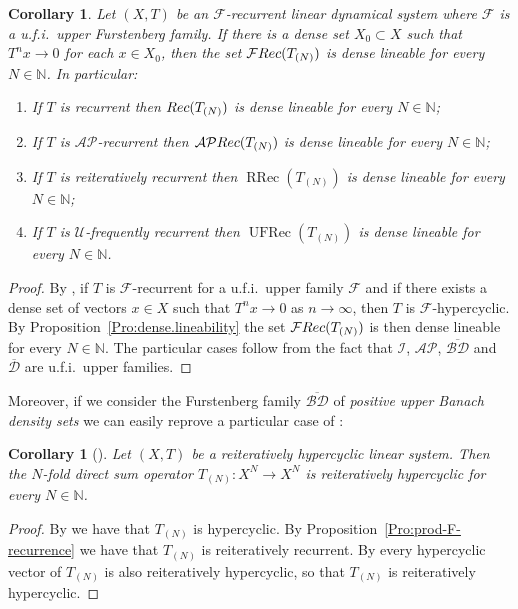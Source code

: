 \documentclass[openright,11pt]{article}
\theoremstyle{plain}
\newtheorem{corollary}[theorem]{Corollary}
\theoremstyle{definition}
\newcommand{\NN}{\mathbb{N}}
\newcommand{\AP}{\mathcal{AP}}
\newcommand{\Fc}{\mathcal{F}}
\newcommand{\Ic}{\mathcal{I}}
\newcommand{\Uc}{\mathcal{U}}
\newcommand{\UFRec}{\operatorname{UFRec}}
\newcommand{\RRec}{\operatorname{RRec}}
\newcommand{\Rec}{\textup{Rec}}
\newcommand{\BDsup}{\overline{\mathcal{BD}}}
\newcommand{\Dsup}{\overline{\mathcal{D}}}
\begin{document}
\begin{corollary}
	Let $(X,T)$ be an $\Fc$-recurrent linear dynamical system where $\Fc$ is a u.f.i.\ upper Furstenberg family. If there is a dense set $X_0 \subset X$ such that $T^nx\to 0$ for each $x \in X_0$, then the set $\Fc\Rec(T_{(N)})$ is dense lineable for every $N \in \NN$. In particular:
	\begin{enumerate}[{\em(a)}]
		\item If $T$ is recurrent then $\Rec(T_{(N)})$ is dense lineable for every $N \in \NN$;
		
		\item If $T$ is $\AP$-recurrent then $\AP\Rec(T_{(N)})$ is dense lineable for every $N \in \NN$;
		
		\item If $T$ is reiteratively recurrent then $\RRec(T_{(N)})$ is dense lineable for every $N \in \NN$;
		
		\item If $T$ is $\Uc$-frequently recurrent then $\UFRec(T_{(N)})$ is dense lineable for every $N \in \NN$.
	\end{enumerate}
\end{corollary}
\begin{proof}
	By \cite[Theorem~8.5]{BoGrLoPe2022}, if $T$ is $\Fc$-recurrent for a u.f.i.\ upper family $\Fc$ and if there exists a dense set of vectors $x \in X$ such that $T^nx \to 0$ as $n \to \infty$, then $T$ is $\Fc$-hypercyclic. By Proposition~\ref{Pro:dense.lineability} the set $\Fc\Rec(T_{(N)})$ is then dense lineable for every $N \in \NN$. The particular cases follow from the fact that $\Ic$, $\AP$, $\BDsup$ and $\Dsup$ are u.f.i.\ upper families.
\end{proof}

Moreover, if we consider the Furstenberg family $\BDsup$ of {\em positive upper Banach density sets} we can easily reprove a particular case of \cite[Theorem 2.5 and Corollary 2.8]{ErEsMe2021}:

\begin{corollary}[\textbf{\cite[Theorem~2.5 and Corollary~2.8]{ErEsMe2021}}]
	Let $(X,T)$ be a reiteratively hypercyclic linear system. Then the $N$-fold direct sum operator $T_{(N)}:X^N\longrightarrow X^N$ is reiteratively hypercyclic for every $N \in \NN$.
\end{corollary}
\begin{proof}
	By \cite[Proposition 4]{BMPP2016} we have that $T_{(N)}$ is hypercyclic. By Proposition~\ref{Pro:prod-F-recurrence} we have that $T_{(N)}$ is reiteratively recurrent. By \cite[Theorem 2.1]{BoGrLoPe2022} every hypercyclic vector of $T_{(N)}$ is also reiteratively hypercyclic, so that $T_{(N)}$ is reiteratively hypercyclic.
\end{proof}
\end{document}
